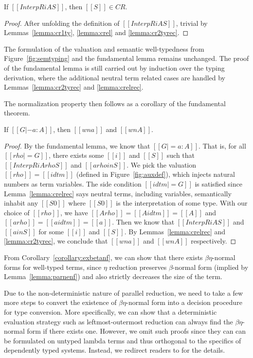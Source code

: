 \documentclass[acmsmall,screen=true,
\ifpublic review=false\else,review=true\fi
  ,anonymous=\ifanonymous true\else false\fi]{acmart}
\begin{document}
\begin{lemma}
  \label{lemma:crelrec}
  If $[[InterpR i A S]]$, then $[[S]] \in CR$.
\end{lemma}
\begin{proof}
  After unfolding the definition of $[[InterpR i A S]]$, trivial by
  Lemmas~\ref{lemma:cr1ty}, \ref{lemma:crel} and \ref{lemma:cr2tyrec}.
\end{proof}

The formulation of the valuation and semantic well-typedness from
Figure~\ref{fig:semtyping} and the fundamental lemma remains
unchanged.
The proof of the fundamental lemma is still carried out by induction
over the typing derivation, where the additional neutral term related
cases are handled by Lemmas~\ref{lemma:cr2tyrec} and
\ref{lemma:crelrec}.

The normalization property then follows as a corollary of the
fundamental theorem.
\begin{corollary}
  \label{corollary:exbetanf}
  If $[[G |- a : A]]$, then $[[wn a]]$ and $[[wn A]]$.
\end{corollary}
\begin{proof}
  By the fundamental lemma, we know that $[[G |= a : A]]$. That is,
  for all $[[rho |= G]]$, there exists some $[[i]]$ and $[[S]]$ such
  that $[[InterpR i A {rho} S]]$ and $[[a {rho} in S]]$.
  We pick the valuation $[[rho]] = [[idtm]]$ (defined in Figure~\ref{fig:auxdef}), which injects
  natural numbers as term variables. The side condition $[[idtm |=
  G]]$ is satisfied since Lemma~\ref{lemma:crelrec} says neutral terms,
  including variables, semantically inhabit any $[[S0]]$ where
  $[[S0]]$ is the interpretation of some type. With our choice of
  $[[rho]]$, we have $[[A {rho}]] = [[A {idtm}]] = [[A]]$ and $[[a {rho}]] = [[a{idtm}]] = [[a]]$. Then we
  know that $[[InterpR i A S]]$ and $[[a in S]]$ for some $[[i]]$ and
  $[[S]]$. By Lemmas~\ref{lemma:crelrec} and \ref{lemma:cr2tyrec}, we
  conclude that $[[wn a]]$ and $[[wn A]]$ respectively.
\end{proof}
From Corollary~\ref{corollary:exbetanf}, we can show that there exists
$\beta\eta$-normal forms for well-typed terms, since $\eta$ reduction
preserves $\beta$-normal form (implied by Lemma~\ref{lemma:parnenf})
and also strictly decreases the size of the term.

Due to the non-deterministic nature of parallel reduction, we need to
take a few more steps to convert the existence of $\beta\eta$-normal
form into a decision procedure for type conversion. More specifically,
we can show that a deterministic evaluation strategy such as
leftmost-outermost reduction can always find the $\beta\eta$-normal
form if there exists one. However, we omit such proofs since they can
can be formulated on untyped lambda terms and thus orthogonal to the
specifics of dependently typed systems. Instead, we redirect readers
to \citet{factorization-essentially, takahashi-parallel-reduction} for
the details.
\end{document}
